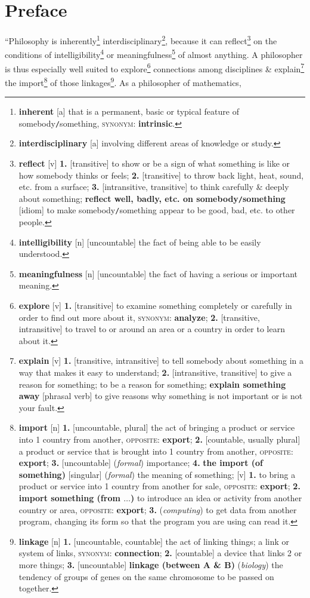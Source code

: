 \documentclass[oneside]{book}
\numberwithin{equation}{section}
\begin{document}
\section*{Preface}
``Philosophy is inherently\footnote{\textbf{inherent} [a] that is a permanent, basic or typical feature of somebody\texttt{/}something, \textsc{synonym}: \textbf{intrinsic}.} interdisciplinary\footnote{\textbf{interdisciplinary} [a] involving different areas of knowledge or study.}, because it can reflect\footnote{\textbf{reflect} [v] \textbf{1.} [transitive] to show or be a sign of what something is like or how somebody thinks or feels;  \textbf{2.} [transitive] to throw back light, heat, sound, etc. from a surface; \textbf{3.} [intransitive, transitive] to think carefully \& deeply about something; \textbf{reflect well, badly, etc. on somebody\texttt{/}something} [idiom] to make somebody\texttt{/}something appear to be good, bad, etc. to other people.} on the conditions of intelligibility\footnote{\textbf{intelligibility} [n] [uncountable] the fact of being able to be easily understood.} or meaningfulness\footnote{\textbf{meaningfulness} [n] [uncountable] the fact of having a serious or important meaning.} of almost anything. A philosopher is thus especially well suited to explore\footnote{\textbf{explore} [v] \textbf{1.} [transitive] to examine something completely or carefully in order to find out more about it, \textsc{synonym}: \textbf{analyze}; \textbf{2.} [transitive, intransitive] to travel to or around an area or a country in order to learn about it.} connections among disciplines \& explain\footnote{\textbf{explain} [v] \textbf{1.} [transitive, intransitive] to tell somebody about something in a way that makes it easy to understand; \textbf{2.} [intransitive, transitive] to give a reason for something; to be a reason for something; \textbf{explain something away} [phrasal verb] to give reasons why something is not important or is not your fault.} the import\footnote{\textbf{import} [n] \textbf{1.} [uncountable, plural] the act of bringing a product or service into 1 country from another, \textsc{opposite}: \textbf{export}; \textbf{2.} [countable, usually plural] a product or service that is brought into 1 country from another, \textsc{opposite}: \textbf{export}; \textbf{3.} [uncountable] (\textit{formal}) importance; \textbf{4.} \textbf{the import (of something)} [singular] (\textit{formal}) the meaning of something; [v] \textbf{1.} to bring a product or service into 1 country from another for sale, \textsc{opposite}: \textbf{export}; \textbf{2.} \textbf{import something (from $\ldots$)} to introduce an idea or activity from another country or area, \textsc{opposite}: \textbf{export}; \textbf{3.} (\textit{computing}) to get data from another program, changing its form so that the program you are using can read it.} of those linkages\footnote{\textbf{linkage} [n] \textbf{1.} [uncountable, countable] the act of linking things; a link or system of links, \textsc{synonym}: \textbf{connection}; \textbf{2.} [countable] a device that links 2 or more things; \textbf{3.} [uncountable] \textbf{linkage (between A \& B)} (\textit{biology}) the tendency of groups of genes on the same chromosome to be passed on together.}. As a philosopher of mathematics, 
\end{document}
